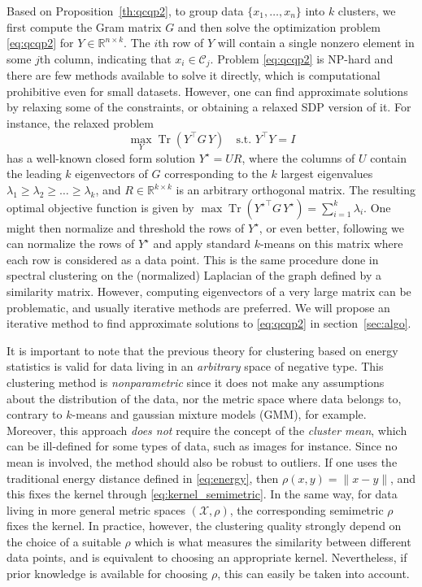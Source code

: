 \documentclass[aps,preprint,nofootinbib,floatfix]{revtex4-1}
\DeclareMathOperator{\Tr}{Tr}
\newcommand\C{{\mathcal{C}}}
\newcommand\Zt{Y}
\begin{document}
Based on Proposition~\ref{th:qcqp2}, to group data $\{ x_1,\dotsc,x_n \}$
into  $k$ clusters, we first compute the Gram matrix
$G$ and then 
solve the optimization problem \eqref{eq:qcqp2} for $\Zt \in
\mathbb{R}^{n\times k}$. The $i$th row
of $\Zt$ will contain a single nonzero element in some $j$th column,
indicating that $x_i \in \C_j$. 
Problem \eqref{eq:qcqp2} is NP-hard and there
are few methods
available to solve it directly,
which is computational prohibitive even for small datasets.
However, one can find approximate solutions by relaxing some 
of the constraints, or obtaining a relaxed SDP version of it.
For instance, the relaxed problem
\begin{equation}
\max_{Y} \Tr \left( Y^\top G \, Y \right) \quad \mbox{s.t. $Y^\top Y = I$}
\end{equation}
has a well-known closed form solution $Y^\star = U R$, where the
columns of $U$ contain the leading $k$ eigenvectors of $G$ corresponding
to the $k$ largest eigenvalues $\lambda_1\ge \lambda_2\ge\dotsc\ge\lambda_k$, 
and
$R \in \mathbb{R}^{k\times k}$ is an arbitrary orthogonal matrix. 
The resulting
optimal objective function is given by
$\max \Tr \left( {Y^\star}^\top G \, Y^\star \right)  = 
\sum_{i=1}^k \lambda_i$. One might then normalize and threshold the rows
of $Y^\star$, or even better, following \cite{NgJordan} we can normalize the
rows of $Y^\star$ and apply standard $k$-means on this matrix where each
row is considered as a data point.
This is the same 
procedure done in spectral clustering on the (normalized) Laplacian
of the graph defined by a similarity matrix.
However, computing eigenvectors of a very large matrix
can be problematic, and usually iterative methods are preferred.
We will propose an iterative method to find approximate solutions
to \eqref{eq:qcqp2} in section~\ref{sec:algo}.

It is important to note 
that the previous theory for clustering based on energy statistics
is valid for data living in an \emph{arbitrary} space of negative type.
This clustering method is
\emph{nonparametric} since it does not make any assumptions
about 
the distribution of the data, nor the metric space where data belongs
to,
contrary to $k$-means and gaussian mixture models (GMM), for example.
Moreover, this approach \emph{does not} require the concept of the 
\emph{cluster mean},
which can be ill-defined for some types of data, such as images for
instance. Since no mean is involved, the method should also be 
robust to outliers.
If one uses the traditional energy distance
defined in \eqref{eq:energy}, 
then $\rho(x,y) = \| x - y\|$, and this fixes the kernel
through \eqref{eq:kernel_semimetric}. In the same way, 
for data living in more general
metric spaces $(\mathcal{X}, \rho)$, the corresponding semimetric $\rho$ fixes
the kernel.
In practice, however,
the clustering quality strongly depend on the choice of a suitable
$\rho$ which is what measures the similarity between different data points,
and is equivalent to choosing an appropriate kernel.
Nevertheless, if prior knowledge is available for choosing $\rho$, 
this can easily be taken into account.
\end{document}
